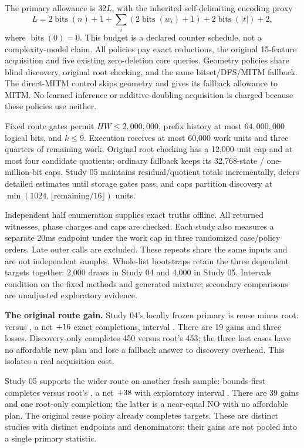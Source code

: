 \documentclass[10pt,english]{article}
\begin{document}
The primary allowance is $32L$, with the inherited self-delimiting encoding proxy
$$
L=2\operatorname{bits}(n)+1+
\sum_i(2\operatorname{bits}(w_i)+1)+2\operatorname{bits}(|t|)+2,
$$
where $\operatorname{bits}(0)=0$. This budget is a declared counter schedule, not a complexity-model claim. All policies pay exact reductions, the original 15-feature acquisition and five existing zero-deletion core queries. Geometry policies share blind discovery, original root checking, and the same bitset/DFS/MITM fallback. The direct-MITM control skips geometry and gives its fallback allowance to MITM. No learned inference or additive-doubling acquisition is charged because these policies use neither.

Fixed route gates permit $HW\le2{,}000{,}000$, prefix history at most $64{,}000{,}000$ logical bits, and $k\le9$. Execution receives at most 60,000 work units and three quarters of remaining work. Original root checking has a 12,000-unit cap and at most four candidate quotients; ordinary fallback keeps its 32,768-state / one-million-bit caps. Study 05 maintains residual/quotient totals incrementally, defers detailed estimates until storage gates pass, and caps partition discovery at $\min(1024,\lfloor\text{remaining}/16\rfloor)$ units.

Independent half enumeration supplies exact truths offline. All returned witnesses, phase charges and caps are checked. Each study also measures a separate 20ms endpoint under the work cap in three randomized case/policy orders. Late outer calls are excluded. These repeats share the same inputs and are not independent samples. Whole-list bootstraps retain the three dependent targets together: 2,000 draws in Study 04 and 4,000 in Study 05. Intervals condition on the fixed methods and generated mixture; secondary comparisons are unadjusted exploratory evidence.



\textbf{The original route gain.} Study 04's locally frozen primary is reuse minus root: \SevenFirstReuse{} versus \SevenFirstRoot{}, a net $+16$ exact completions, interval \SevenFirstInterval. There are 19 gains and three losses. Discovery-only completes 450 versus root's 453; the three lost cases have no affordable new plan and lose a fallback answer to discovery overhead. This isolates a real acquisition cost.

Study 05 supports the wider route on another fresh sample: bounds-first completes \SevenSecondBounds{} versus root's \SevenSecondRoot{}, a net $+38$ with exploratory interval \SevenSecondInterval. There are 39 gains and one root-only completion; the latter is a near-equal NO with no affordable plan. The original reuse policy already completes \SevenSecondReuse{} targets. These are distinct studies with distinct endpoints and denominators; their gains are not pooled into a single primary statistic.
\end{document}
